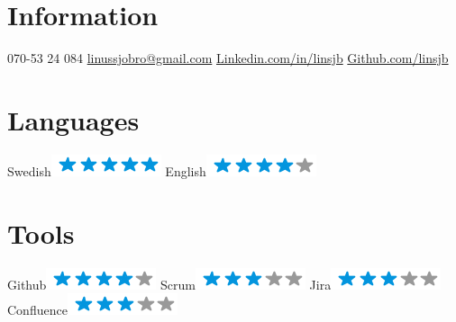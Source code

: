 \begin{aside}
    \section{Information}
      070-53 24 084
      \href{mailto:linussjobro@gmail.com}{linussjobro@gmail.com}
      \href{https://www.linkedin.com/in/linsjb}{Linkedin.com/in/linsjb}
      \href{https://github.com/linsjb}{Github.com/linsjb}
    \section{Languages}
      Swedish\includegraphics[scale=0.40]{img/5stars.png}
      English\includegraphics[scale=0.40]{img/4stars.png}
    \section{Tools}
      Github\includegraphics[scale=0.40]{img/4stars.png}
      Scrum\includegraphics[scale=0.40]{img/3stars.png}
      Jira\includegraphics[scale=0.40]{img/3stars.png}
      Confluence\includegraphics[scale=0.40]{img/3stars.png}

\end{aside}

